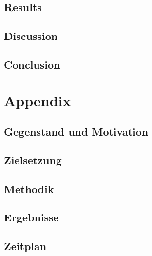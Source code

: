 \documentclass[12pt,toc=bib,toc=listof]{scrreprt}
\begin{document}
\section{Results}


\section{Discussion}


\section{Conclusion}



 

\endgroup

\clearpage
\onecolumn
\restoregeometry 
{}
\pagestyle{scrheadings}

\appendix
\chapter{Appendix}

\section{Gegenstand und Motivation}


\section{Zielsetzung}


\section{Methodik}


\section{Ergebnisse}


\section{Zeitplan}

\end{document}
